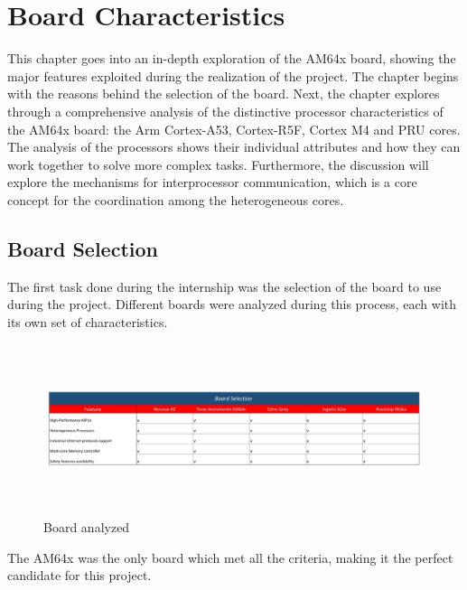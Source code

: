 

\chapter{Board Characteristics}

This chapter goes into an in-depth exploration of the AM64x board, showing the
major features exploited during the realization of the project.
The chapter begins with the reasons behind the selection of the board.
Next, the chapter explores through a comprehensive analysis of the
distinctive processor characteristics of the AM64x board: the Arm Cortex-A53,
Cortex-R5F, Cortex M4 and PRU cores. The analysis of the processors shows their
individual attributes and how they can work together to solve more complex
tasks.
Furthermore, the discussion will explore the mechanisms for interprocessor
communication, which is a core concept for the coordination among the
heterogeneous cores.

\section{Board Selection}

The first task done during the internship was the selection of the board to use
during the project.
Different boards were analyzed during this process, each with its own set of
characteristics.

\begin{figure}
    \centering
    \includegraphics[height=5cm, width=1.0\textwidth]{Figures/board_selection.jpg}
    \caption{Board analyzed}
\end{figure}

The AM64x was the only board which met all the criteria, making it the perfect
candidate for this project.

